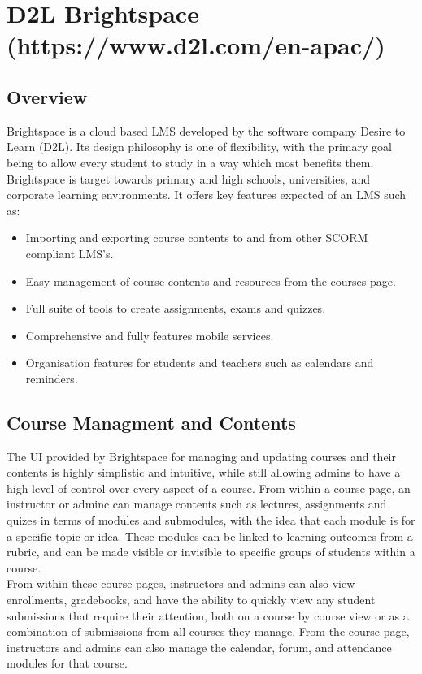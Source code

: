 \section{D2L Brightspace (https://www.d2l.com/en-apac/)}
\subsection{Overview}
Brightspace is a cloud based LMS developed by the software company Desire to Learn (D2L). Its design philosophy is one of flexibility, with the primary goal being to allow every student to study in a way which most benefits them. Brightspace is target towards primary and high schools, universities, and corporate learning environments. It offers key features expected of an LMS such as:
\begin{itemize}
  \item Importing and exporting course contents to and from other SCORM compliant LMS's.
  \item Easy management of course contents and resources from the courses page.
  \item Full suite of tools to create assignments, exams and quizzes.
  \item Comprehensive and fully features mobile services.
  \item Organisation features for students and teachers such as calendars and reminders.
\end{itemize}

\subsection{Course Managment and Contents}
The UI provided by Brightspace for managing and updating courses and their contents is highly simplistic and intuitive, while still allowing admins to have a high level of control over every aspect of a course. From within a course page, an instructor or adminc can manage contents such as lectures, assignments and quizes in terms of modules and submodules, with the idea that each module is for a specific topic or idea. These modules can be linked to learning outcomes from a rubric, and can be made visible or invisible to specific groups of students within a course.\\ 
From within these course pages, instructors and admins can also view enrollments, gradebooks, and have the ability to quickly view any student submissions that require their attention, both on a course by course view or as a combination of submissions from all courses they manage. From the course page, instructors and admins can also manage the calendar, forum, and attendance modules for that course.

